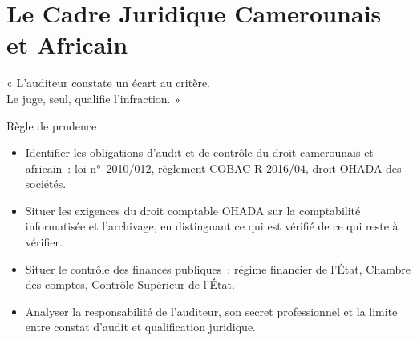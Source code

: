 
\chapter{Le Cadre Juridique Camerounais et Africain}
\label{chap:droit}

\epigraph{%
    « L'auditeur constate un écart au critère.\\
    Le juge, seul, qualifie l'infraction. »%
}{Règle de prudence}


\begin{boxobjectifs}
\begin{itemize}
    \item Identifier les obligations d'audit et de contrôle du droit
          camerounais et africain~: loi n°~2010/012, règlement COBAC
          R-2016/04, droit OHADA des sociétés.
    \item Situer les exigences du droit comptable OHADA sur la comptabilité
          informatisée et l'archivage, en distinguant ce qui est vérifié de
          ce qui reste à vérifier.
    \item Situer le contrôle des finances publiques~: régime financier de
          l'État, Chambre des comptes, Contrôle Supérieur de l'État.
    \item Analyser la responsabilité de l'auditeur, son secret
          professionnel et la limite entre constat d'audit et qualification
          juridique.
\end{itemize}
\end{boxobjectifs}

